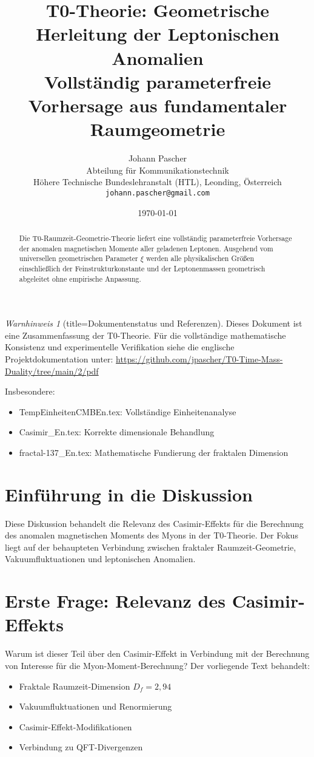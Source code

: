 \documentclass[12pt,a4paper]{article}
\title{T0-Theorie: Geometrische Herleitung der Leptonischen Anomalien \\
	\large Vollständig parameterfreie Vorhersage aus fundamentaler Raumgeometrie}
\author{Johann Pascher\\
	Abteilung für Kommunikationstechnik\\
	Höhere Technische Bundeslehranstalt (HTL), Leonding, Österreich\\
	\texttt{johann.pascher@gmail.com}}
\date{\today}
\newcommand{\xipar}{\xi}
\theoremstyle{remark}
\newtheorem{warning}{Warnhinweis}
\begin{document}
	
	\maketitle
	
	\begin{abstract}
		Die T0-Raumzeit-Geometrie-Theorie liefert eine vollständig parameterfreie Vorhersage der anomalen magnetischen Momente aller geladenen Leptonen. Ausgehend vom universellen geometrischen Parameter $\xipar$ werden alle physikalischen Größen einschließlich der Feinstrukturkonstante und der Leptonenmassen geometrisch abgeleitet ohne empirische Anpassung.
	\end{abstract}
	
	\begin{warning}[title=Dokumentenstatus und Referenzen]
		Dieses Dokument ist eine Zusammenfassung der T0-Theorie. Für die vollständige mathematische Konsistenz und experimentelle Verifikation siehe die englische Projektdokumentation unter:
		\url{https://github.com/jpascher/T0-Time-Mass-Duality/tree/main/2/pdf}
		
		Insbesondere:
		\begin{itemize}
			\item TempEinheitenCMBEn.tex: Vollständige Einheitenanalyse
			\item Casimir\_En.tex: Korrekte dimensionale Behandlung
			\item fractal-137\_En.tex: Mathematische Fundierung der fraktalen Dimension
		\end{itemize}
	\end{warning}
	
	\tableofcontents
	\newpage
\section{Einführung in die Diskussion}

Diese Diskussion behandelt die Relevanz des Casimir-Effekts für die Berechnung des anomalen magnetischen Moments des Myons in der T0-Theorie. Der Fokus liegt auf der behaupteten Verbindung zwischen fraktaler Raumzeit-Geometrie, Vakuumfluktuationen und leptonischen Anomalien.

\section{Erste Frage: Relevanz des Casimir-Effekts}

\begin{question}
	Warum ist dieser Teil über den Casimir-Effekt in Verbindung mit der Berechnung von Interesse für die Myon-Moment-Berechnung? Der vorliegende Text behandelt:
	
	\begin{itemize}
		\item Fraktale Raumzeit-Dimension $D_f = 2{,}94$
		\item Vakuumfluktuationen und Renormierung
		\item Casimir-Effekt-Modifikationen
		\item Verbindung zu QFT-Divergenzen
	\end{itemize}
\end{question}
\end{document}
